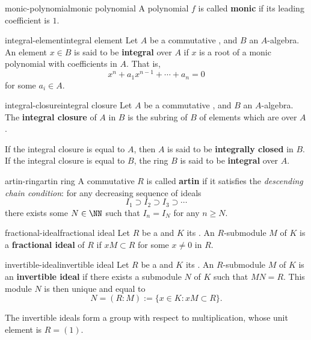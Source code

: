 \begin{topic}{monic-polynomial}{monic polynomial}
    A polynomial $f$ is called \textbf{monic} if its leading coefficient is $1$.
\end{topic}

\begin{topic}{integral-element}{integral element}
    Let $A$ be a commutative , and $B$ an $A$-algebra. An element $x \in B$ is said to be \textbf{integral} over $A$ if $x$ is a root of a monic polynomial with coefficients in $A$. That is,
    \[ x^n + a_1 x^{n - 1} + \cdots + a_n = 0 \]
    for some $a_i \in A$.
\end{topic}

\begin{topic}{integral-closure}{integral closure}
    Let $A$ be a commutative , and $B$ an $A$-algebra. The \textbf{integral closure} of $A$ in $B$ is the subring of $B$ of elements which are  over $A$.
    
    If the integral closure is equal to $A$, then $A$ is said to be \textbf{integrally closed} in $B$. If the integral closure is equal to $B$, the ring $B$ is said to be \textbf{integral} over $A$.
\end{topic}

\begin{topic}{artin-ring}{artin ring}
    A commutative  $R$ is called \textbf{artin} if it satisfies the \textit{descending chain condition}: for any decreasing sequence of ideals
    \[ I_1 \supset I_2 \supset I_3 \supset \cdots \]
    there exists some $N \in \NN$ such that $I_n = I_N$ for any $n \ge N$.
\end{topic}

\begin{topic}{fractional-ideal}{fractional ideal}
    Let $R$ be a  and $K$ its . An $R$-submodule $M$ of $K$ is a \textbf{fractional ideal} of $R$ if $xM \subset R$ for some $x \ne 0$ in $R$.
\end{topic}

\begin{topic}{invertible-ideal}{invertible ideal}
    Let $R$ be a  and $K$ its . An $R$-submodule $M$ of $K$ is an \textbf{invertible ideal} if there exists a submodule $N$ of $K$ such that $MN = R$. This module $N$ is then unique and equal to
    \[ N = (R : M) := \{ x \in K : xM \subset R \} . \]
    
    The invertible ideals form a group with respect to multiplication, whose unit element is $R = (1)$.
\end{topic}

